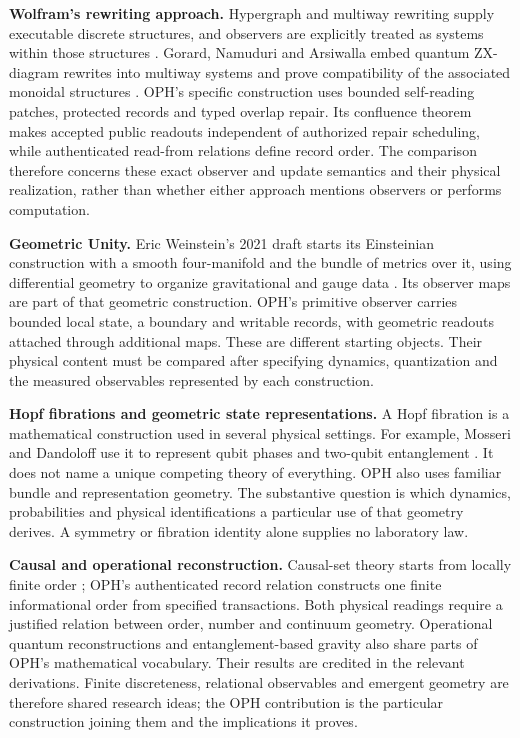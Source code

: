 \textbf{Wolfram's rewriting approach.}
Hypergraph and multiway rewriting supply executable discrete structures, and
observers are explicitly treated as systems within those structures
\cite{comparisonWolfram}. Gorard, Namuduri and Arsiwalla embed quantum
ZX-diagram rewrites into multiway systems and prove compatibility of the
associated monoidal structures \cite{comparisonGorard}. OPH's specific
construction uses bounded self-reading patches, protected records and typed
overlap repair. Its confluence theorem makes accepted public readouts
independent of authorized repair scheduling, while authenticated read-from
relations define record order. The comparison therefore concerns these exact
observer and update semantics and their physical realization, rather than
whether either approach mentions observers or performs computation.

\textbf{Geometric Unity.}
Eric Weinstein's 2021 draft starts its Einsteinian construction with a smooth
four-manifold and the bundle of metrics over it, using differential geometry
to organize gravitational and gauge data \cite{comparisonWeinstein}.
Its observer maps are part of that geometric construction. OPH's primitive
observer carries bounded local state, a boundary and writable records, with geometric
readouts attached through additional maps. These are different starting
objects. Their physical content must be compared after specifying dynamics,
quantization and the measured observables represented by each construction.

\textbf{Hopf fibrations and geometric state representations.}
A Hopf fibration is a mathematical construction used in several physical
settings. For example, Mosseri and Dandoloff use it to represent qubit phases
and two-qubit entanglement \cite{comparisonMosseriDandoloff}. It does not name
a unique competing theory of everything. OPH also uses familiar bundle and
representation geometry. The substantive question is which dynamics,
probabilities and physical identifications a particular use of that geometry
derives. A symmetry or fibration identity alone supplies no laboratory law.

\textbf{Causal and operational reconstruction.}
Causal-set theory starts from locally finite order
\cite{bombelli1987,surya2019}; OPH's authenticated record relation constructs
one finite informational order from specified transactions. Both physical
readings require a justified relation between order, number and continuum
geometry. Operational quantum reconstructions and entanglement-based gravity
also share parts of OPH's mathematical vocabulary. Their results are credited
in the relevant derivations. Finite discreteness, relational observables and
emergent geometry are therefore shared research ideas; the OPH contribution
is the particular construction joining them and the implications it proves.

